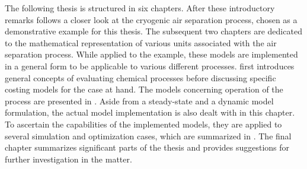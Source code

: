 The following thesis is structured in six chapters. After these introductory remarks follows a closer look 
at the cryogenic air separation process, chosen as a demonstrative example for this thesis.  
The subsequent two chapters are dedicated to the mathematical representation of various units 
associated with the air separation process. While applied to the example, these models are implemented 
in a general form to be applicable to various different processes.  first introduces
general concepts of evaluating chemical processes before discussing specific costing models for the case at hand. 
The models concerning operation of the process are presented in . Aside from a steady-state
and a dynamic model formulation, the actual model implementation is also dealt with in this chapter. 
To ascertain the capabilities of the implemented models, they are applied to several simulation and 
optimization cases, which are summarized in . 
The final chapter summarizes significant parts of the thesis and provides suggestions for further investigation in
the matter.


